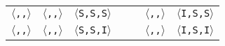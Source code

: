 \begin{tabular}{|c|c|c|c|c|c|c|}
\texttt{$\langle$\benchi{},\benchx{},\benchx{}$\rangle$}

& \texttt{$\langle$\benchs{},\benchx{},\benchx{}$\rangle$}
& \texttt{$\langle$S,S,S$\rangle$}

&
&

& \texttt{$\langle$\benchi{},\benchx{},\benchx{}$\rangle$}
& \texttt{$\langle$I,S,S$\rangle$}
\\
\cline{1-3}
\cline{6-7}

\texttt{$\langle$\benchx{},\benchx{},\benchi{}$\rangle$}

& \texttt{$\langle$\benchx{},\benchx{},\benchi{}$\rangle$}
& \texttt{$\langle$S,S,I$\rangle$}

&
&

& \texttt{$\langle$\benchi{},\benchx{},\benchi{}$\rangle$}
& \texttt{$\langle$I,S,I$\rangle$}
\\
\hline

\end{tabular}
